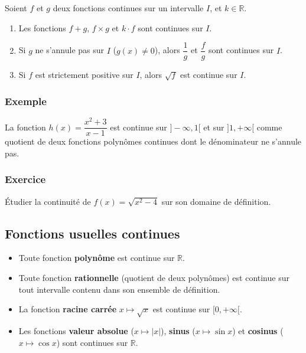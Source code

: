 \documentclass[12pt,a4paper]{article}
\begin{document}
\begin{tcolorbox}[
    colframe=primary,
    colback=boxbg,
    coltitle=white,
    colbacktitle=titlebg,
    fonttitle=\bfseries,
    title=Propriété,
    arc=3mm,
    boxrule=1pt
]
Soient $f$ et $g$ deux fonctions continues sur un intervalle $I$, et $k \in \mathbb{R}$.
\begin{enumerate}[label=\arabic*.]
    \item Les fonctions $f + g$, $f \times g$ et $k \cdot f$ sont continues sur $I$.
    \item Si $g$ ne s'annule pas sur $I$ ($g(x) \neq 0$), alors $\dfrac{1}{g}$ et $\dfrac{f}{g}$ sont continues sur $I$.
    \item Si $f$ est strictement positive sur $I$, alors $\sqrt{f}$ est continue sur $I$.
\end{enumerate}
\end{tcolorbox}

\subsubsection*{Exemple}
La fonction $h(x) = \dfrac{x^2 + 3}{x - 1}$ est continue sur $]-\infty, 1[$ et sur $]1, +\infty[$ comme quotient de deux fonctions polynômes continues dont le dénominateur ne s'annule pas.

\subsubsection*{Exercice}
Étudier la continuité de $f(x) = \sqrt{x^2 - 4}$ sur son domaine de définition.

\vspace{0.5cm}
\subsection{Fonctions usuelles continues}

\begin{tcolorbox}[
    colframe=primary,
    colback=boxbg,
    coltitle=white,
    colbacktitle=titlebg,
    fonttitle=\bfseries,
    title=Propriété,
    arc=3mm,
    boxrule=1pt
]
\begin{itemize}
    \item Toute fonction \textbf{polynôme} est continue sur $\mathbb{R}$.
    \item Toute fonction \textbf{rationnelle} (quotient de deux polynômes) est continue sur tout intervalle contenu dans son ensemble de définition.
    \item La fonction \textbf{racine carrée} $x \mapsto \sqrt{x}$ est continue sur $[0, +\infty[$.
    \item Les fonctions \textbf{valeur absolue} ($x \mapsto |x|$), \textbf{sinus} ($x \mapsto \sin x$) et \textbf{cosinus} ($x \mapsto \cos x$) sont continues sur $\mathbb{R}$.
\end{itemize}
\end{tcolorbox}
\end{document}
